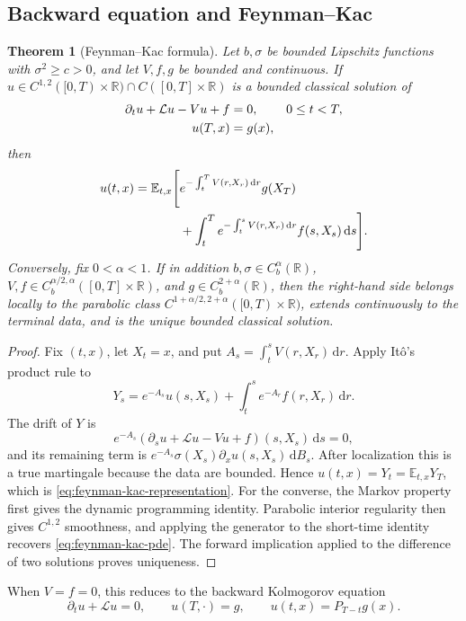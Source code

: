 \documentclass[10pt,a4paper]{article}
\numberwithin{equation}{section}
\theoremstyle{blueplain}
\newtheorem{theorem}{Theorem}[section]
\theoremstyle{definition}
\newcommand{\E}{\mathbb E}
\newcommand{\R}{\mathbb R}
\newcommand{\dd}{\,\mathrm d}
\begin{document}
\subsection{Backward equation and Feynman--Kac}

\begin{theorem}[Feynman--Kac formula]
Let \(b,\sigma\) be bounded Lipschitz functions with
\(\sigma^2\ge c>0\), and let \(V,f,g\) be bounded and continuous.  If
\(u\in C^{1,2}([0,T)\times\R)\cap C([0,T]\times\R)\) is a bounded classical
solution of
\begin{align}
  \partial_tu+\mathcal Lu-Vu+f&=0,
  &&0\le t<T,\notag\\
  u(T,x)&=g(x),
  \label{eq:feynman-kac-pde}
\end{align}
then
\begin{align}
 u(t,x)=\E_{t,x}\Bigg[&
 e^{-\int_t^T V(r,X_r)\dd r}g(X_T)\notag\\
 &+\int_t^T e^{-\int_t^sV(r,X_r)\dd r}
 f(s,X_s)\dd s\Bigg].
 \label{eq:feynman-kac-representation}
\end{align}
Conversely, fix \(0<\alpha<1\).  If in addition
\(b,\sigma\in C_b^\alpha(\R)\),
\(V,f\in C_b^{\alpha/2,\alpha}([0,T]\times\R)\), and
\(g\in C_b^{2+\alpha}(\R)\), then the right-hand side belongs locally to the
parabolic class \(C^{1+\alpha/2,2+\alpha}([0,T)\times\R)\), extends
continuously to the terminal data, and is the unique bounded classical
solution.
\end{theorem}

\begin{proof}
Fix \((t,x)\), let \(X_t=x\), and put
\(A_s=\int_t^sV(r,X_r)\dd r\).  Apply It\^o's product rule to
\[
  Y_s=e^{-A_s}u(s,X_s)
      +\int_t^se^{-A_r}f(r,X_r)\dd r.
\]
The drift of \(Y\) is
\[
 e^{-A_s}(\partial_su+\mathcal Lu-Vu+f)(s,X_s)\dd s=0,
\]
and its remaining term is
\(e^{-A_s}\sigma(X_s)\partial_xu(s,X_s)\dd B_s\).  After localization this
is a true martingale because the data are bounded.  Hence
\(u(t,x)=Y_t=\E_{t,x}Y_T\), which is
\eqref{eq:feynman-kac-representation}.  For the converse, the Markov property
first gives the dynamic programming identity.  Parabolic interior regularity
then gives \(C^{1,2}\) smoothness, and applying the generator to the short-time
identity recovers \eqref{eq:feynman-kac-pde}.  The forward implication applied
to the difference of two solutions proves uniqueness.
\end{proof}

When \(V=f=0\), this reduces to the backward Kolmogorov equation
\begin{equation}
  \partial_tu+\mathcal Lu=0,
  \qquad u(T,\cdot)=g,
  \qquad u(t,x)=P_{T-t}g(x).
  \label{eq:backward-kolmogorov}
\end{equation}
\end{document}
